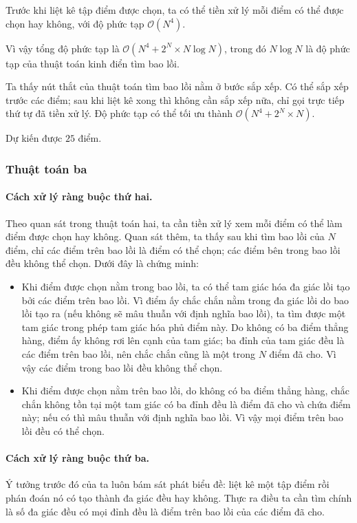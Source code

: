 \documentclass[11pt]{article}
\newcommand{\Oh}{\mathcal{O}}
\begin{document}
Trước khi liệt kê tập điểm được chọn, ta có thể tiền xử lý mỗi điểm có thể
được chọn hay không, với độ phức tạp \(\Oh(N^4)\).

Vì vậy tổng độ phức tạp là \(\Oh(N^4+2^N\times N\log N)\), trong đó
\(N\log N\) là độ phức tạp của thuật toán kinh điển tìm bao lồi.

Ta thấy nút thắt của thuật toán tìm bao lồi nằm ở bước sắp xếp. Có thể sắp
xếp trước các điểm; sau khi liệt kê xong thì không cần sắp xếp nữa, chỉ gọi
trực tiếp thứ tự đã tiền xử lý. Độ phức tạp có thể tối ưu thành
\(\Oh(N^4+2^N\times N)\).

Dự kiến được \(25\) điểm.

\subsubsection{Thuật toán ba}

\paragraph{Cách xử lý ràng buộc thứ hai.}
Theo quan sát trong thuật toán hai, ta cần tiền xử lý xem mỗi điểm có thể làm
điểm được chọn hay không. Quan sát thêm, ta thấy sau khi tìm bao lồi của \(N\)
điểm, chỉ các điểm trên bao lồi là điểm có thể chọn; các điểm bên trong bao
lồi đều không thể chọn. Dưới đây là chứng minh:

\begin{itemize}
  \item Khi điểm được chọn nằm trong bao lồi, ta có thể tam giác hóa đa giác
  lồi tạo bởi các điểm trên bao lồi. Vì điểm ấy chắc chắn nằm trong đa giác
  lồi do bao lồi tạo ra (nếu không sẽ mâu thuẫn với định nghĩa bao lồi), ta
  tìm được một tam giác trong phép tam giác hóa phủ điểm này. Do không có ba
  điểm thẳng hàng, điểm ấy không rơi lên cạnh của tam giác; ba đỉnh của tam
  giác đều là các điểm trên bao lồi, nên chắc chắn cũng là một trong \(N\) điểm
  đã cho. Vì vậy các điểm trong bao lồi đều không thể chọn.

  \item Khi điểm được chọn nằm trên bao lồi, do không có ba điểm thẳng hàng,
  chắc chắn không tồn tại một tam giác có ba đỉnh đều là điểm đã cho và chứa
  điểm này; nếu có thì mâu thuẫn với định nghĩa bao lồi. Vì vậy mọi điểm trên
  bao lồi đều có thể chọn.
\end{itemize}

\paragraph{Cách xử lý ràng buộc thứ ba.}
Ý tưởng trước đó của ta luôn bám sát phát biểu đề: liệt kê một tập điểm rồi
phán đoán nó có tạo thành đa giác đều hay không. Thực ra điều ta cần tìm chính
là số đa giác đều có mọi đỉnh đều là điểm trên bao lồi của các điểm đã cho.
\end{document}
